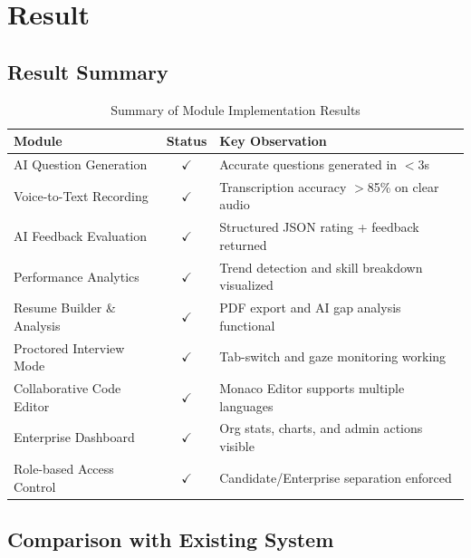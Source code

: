 \documentclass{fisatprojectfinal}
\begin{document}
\chapter{Result}

\section{Result Summary}

\begin{table}[h!]
\centering
\caption{Summary of Module Implementation Results}
\begin{tabular}{|p{4.5cm}|c|p{5.5cm}|}
\hline
\textbf{Module} & \textbf{Status} & \textbf{Key Observation} \\
\hline
AI Question Generation     & $\checkmark$ & Accurate questions generated in $<$3s \\
\hline
Voice-to-Text Recording    & $\checkmark$ & Transcription accuracy $>$85\% on clear audio \\
\hline
AI Feedback Evaluation     & $\checkmark$ & Structured JSON rating + feedback returned \\
\hline
Performance Analytics      & $\checkmark$ & Trend detection and skill breakdown visualized \\
\hline
Resume Builder \& Analysis & $\checkmark$ & PDF export and AI gap analysis functional \\
\hline
Proctored Interview Mode   & $\checkmark$ & Tab-switch and gaze monitoring working \\
\hline
Collaborative Code Editor  & $\checkmark$ & Monaco Editor supports multiple languages \\
\hline
Enterprise Dashboard       & $\checkmark$ & Org stats, charts, and admin actions visible \\
\hline
Role-based Access Control  & $\checkmark$ & Candidate/Enterprise separation enforced \\
\hline
\end{tabular}
\end{table}

\section{Comparison with Existing System}
\end{document}
